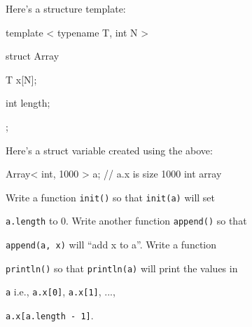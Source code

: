 Here's a structure template:



\begin{consolethree}[escapeinside=||]

template < typename T, int N >

struct Array

{

    T x[N];

    int length;

};

\end{consolethree}



Here's a struct variable created using the above:



\begin{consolethree}[escapeinside=||]

Array< int, 1000 > a; // a.x is size 1000 int array

\end{consolethree}



Write a function \texttt{init()} so that \texttt{init(a)} will set

\texttt{a.length} to 0. Write another function \texttt{append()} so that

\texttt{append(a, x)} will ``add x to a''. Write a function

\texttt{println()} so that \texttt{println(a)} will print the values in

\texttt{a} i.e., \texttt{a.x[0]}, \texttt{a.x[1]}, ...,

\texttt{a.x[a.length - 1]}.

